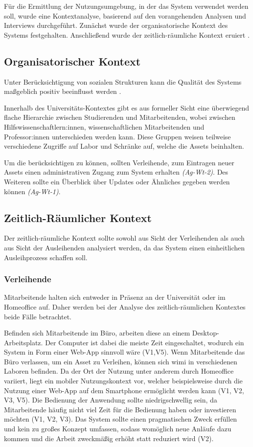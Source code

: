 Für die Ermittlung der Nutzungsumgebung, in der das System verwendet werden soll, wurde eine
Kontextanalyse, basierend auf den vorangehenden Analysen und Interviews durchgeführt. Zunächst wurde
der organisatorische Kontext des Systems festgehalten. Anschließend wurde der zeitlich-räumliche
Kontext eruiert \cite{HerczegSoftEg2018}.

\subsection{Organisatorischer Kontext}
Unter Berücksichtigung von sozialen Strukturen kann die Qualität des Systems maßgeblich positiv
beeinflusst werden \cite{HerczegSoftEg2018}.

Innerhalb des Universitäts-Kontextes gibt es aus formeller Sicht eine überwiegend flache Hierarchie
zwischen Studierenden und Mitarbeitenden, wobei zwischen Hilfswissenschaftlern:innen,
wissenschaftlichen Mitarbeitenden und Professor:innen unterschieden werden kann. Diese Gruppen
weisen teilweise verschiedene Zugriffe auf Labor und Schränke auf, welche die Assets beinhalten.

Um die  berücksichtigen zu können, sollten Verleihende, zum Eintragen neuer
Assets einen administrativen Zugang zum System erhalten \textit{(Ag-Wt-2)}. Des Weiteren sollte ein
Überblick über Updates oder Ähnliches  gegeben werden können \textit{(Ag-Wt-1)}.


\subsection{Zeitlich-Räumlicher Kontext}
\label{section:zeit}
Der zeitlich-räumliche Kontext sollte sowohl aus Sicht der Verleihenden als auch aus Sicht der
Ausleihenden analysiert werden, da das System einen einheitlichen Ausleihprozess schaffen soll.

\subsubsection{Verleihende}
Mitarbeitende halten sich entweder in Präsenz an der Universität oder im Homeoffice auf. Daher
werden bei der Analyse des zeitlich-räumlichen Kontextes beide Fälle betrachtet.

Befinden sich Mitarbeitende im Büro, arbeiten diese an einem Desktop-Arbeitsplatz. Der Computer ist
dabei die meiste Zeit eingeschaltet, wodurch ein System in Form einer Web-App sinnvoll wäre (V1,V5).
Wenn Mitarbeitende das Büro verlassen, um ein Asset zu Verleihen, können sich \ac{wimi} in
verschiedenen Laboren befinden. Da der Ort der Nutzung unter anderem durch Homeoffice variiert,
liegt ein mobiler Nutzungskontext vor, welcher beispielsweise durch die Nutzung einer Web-App auf
dem Smartphone ermöglicht werden kann (V1, V2, V3, V5). Die Bedienung der Anwendung sollte
niedrigschwellig sein, da Mitarbeitende häufig nicht viel Zeit für die Bedienung haben oder
investieren möchten (V1, V2, V3). Das System sollte einen pragmatischen Zweck erfüllen und kein zu
großes Konzept umfassen, sodass womöglich neue Anläufe dazu kommen und die Arbeit zweckmäßig
erhöht statt reduziert wird (V2).


